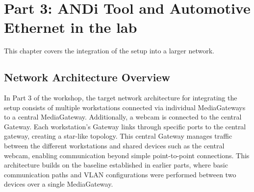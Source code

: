 \section{Part 3: ANDi Tool and Automotive Ethernet in the lab }
\label{sec:network-integration}

This chapter covers the integration of the setup into a larger network.

\subsection{Network Architecture Overview}
In Part 3 of the workshop, the target network architecture for integrating the setup consists of multiple workstations connected via individual MediaGateways to a central MediaGateway. Additionally, a webcam is connected to the central Gateway. Each workstation’s Gateway links through specific ports to the central gateway, creating a star-like topology. This central Gateway manages traffic between the different workstations and shared devices such as the central webcam, enabling communication beyond simple point-to-point connections. This architecture builds on the baseline established in earlier parts, where basic communication paths and VLAN configurations were performed between two devices over a single MediaGateway.

